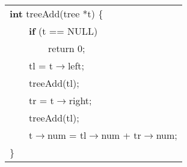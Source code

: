 {\small \tt
      \begin{tabular}[b]{l}
		{\bf int} treeAdd(tree *t) \{     \\ 
		\ \ \ \ {\bf if} (t == NULL)           \\ 
		\ \ \ \ \ \ \ \ return 0;           \\ 
		\ \ \ \ tl = t$\rightarrow$left;    \\
        \ \ \ \ treeAdd(tl); \\
        \ \ \ \ tr = t$\rightarrow$right; \\
		\ \ \ \ treeAdd(tl); \\
		\ \ \ \ t$\rightarrow${num} = tl$\rightarrow${num} + tr$\rightarrow${num}; \\
		\}
      \end{tabular}
}	  
